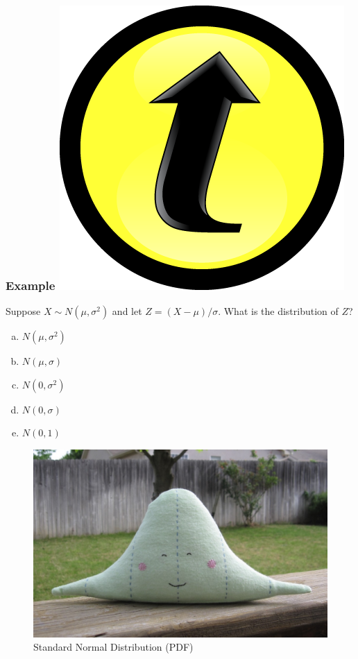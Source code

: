 \documentclass[handout]{beamer}
\begin{document}
\begin{frame}
\frametitle{Example \hfill \includegraphics[scale = 0.05]{./images/clicker}}
Suppose $X \sim N(\mu, \sigma^2)$ and let $Z = (X -\mu)/\sigma$. What is the distribution of $Z$?

\begin{enumerate}[(a)]
	\item $N(\mu, \sigma^2)$
	\item $N(\mu, \sigma)$
	\item $N(0, \sigma^2)$
	\item  $N(0, \sigma)$
	\item $N(0,1)$
\end{enumerate}
\end{frame}



\begin{frame}
\begin{figure}
\includegraphics[scale = 0.2]{./images/normal_etsy1}
\caption{Standard Normal Distribution (PDF)}
\end{figure}
\end{frame}
\end{document}
